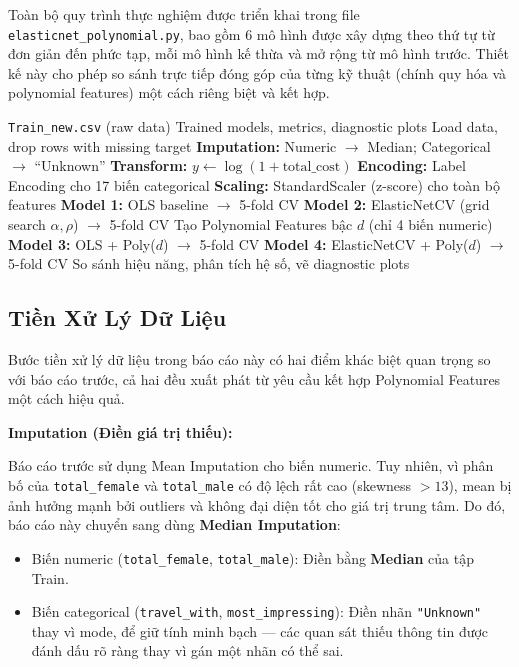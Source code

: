 \documentclass[12pt,a4paper]{article}
\begin{document}
Toàn bộ quy trình thực nghiệm được triển khai trong file \texttt{elasticnet\_polynomial.py}, bao gồm 6 mô hình được xây dựng theo thứ tự từ đơn giản đến phức tạp, mỗi mô hình kế thừa và mở rộng từ mô hình trước. Thiết kế này cho phép so sánh trực tiếp đóng góp của từng kỹ thuật (chính quy hóa và polynomial features) một cách riêng biệt và kết hợp.

\begin{algorithm}[H]
\caption{ElasticNet + Polynomial Regression Pipeline}
\begin{algorithmic}[1]
\Require \texttt{Train\_new.csv} (raw data)
\Ensure Trained models, metrics, diagnostic plots
\State Load data, drop rows with missing target
\State \textbf{Imputation:} Numeric $\rightarrow$ Median; Categorical $\rightarrow$ ``Unknown''
\State \textbf{Transform:} $y \leftarrow \log(1 + \text{total\_cost})$
\State \textbf{Encoding:} Label Encoding cho 17 biến categorical
\State \textbf{Scaling:} StandardScaler (z-score) cho toàn bộ features
\State \textbf{Model 1:} OLS baseline $\rightarrow$ 5-fold CV
\State \textbf{Model 2:} ElasticNetCV (grid search $\alpha, \rho$) $\rightarrow$ 5-fold CV
    \State Tạo Polynomial Features bậc $d$ (chỉ 4 biến numeric)
    \State \textbf{Model 3:} OLS + Poly($d$) $\rightarrow$ 5-fold CV
    \State \textbf{Model 4:} ElasticNetCV + Poly($d$) $\rightarrow$ 5-fold CV
\EndFor
\State So sánh hiệu năng, phân tích hệ số, vẽ diagnostic plots
\end{algorithmic}
\end{algorithm}

\subsection{Tiền Xử Lý Dữ Liệu}

Bước tiền xử lý dữ liệu trong báo cáo này có hai điểm khác biệt quan trọng so với báo cáo trước, cả hai đều xuất phát từ yêu cầu kết hợp Polynomial Features một cách hiệu quả.

\textbf{Imputation (Điền giá trị thiếu):}

Báo cáo trước sử dụng Mean Imputation cho biến numeric. Tuy nhiên, vì phân bố của \texttt{total\_female} và \texttt{total\_male} có độ lệch rất cao (skewness $> 13$), mean bị ảnh hưởng mạnh bởi outliers và không đại diện tốt cho giá trị trung tâm. Do đó, báo cáo này chuyển sang dùng \textbf{Median Imputation}:
\begin{itemize}[leftmargin=1.5em]
    \item Biến numeric (\texttt{total\_female}, \texttt{total\_male}): Điền bằng \textbf{Median} của tập Train.
    \item Biến categorical (\texttt{travel\_with}, \texttt{most\_impressing}): Điền nhãn \texttt{"Unknown"} thay vì mode, để giữ tính minh bạch — các quan sát thiếu thông tin được đánh dấu rõ ràng thay vì gán một nhãn có thể sai.
\end{itemize}
\end{document}
